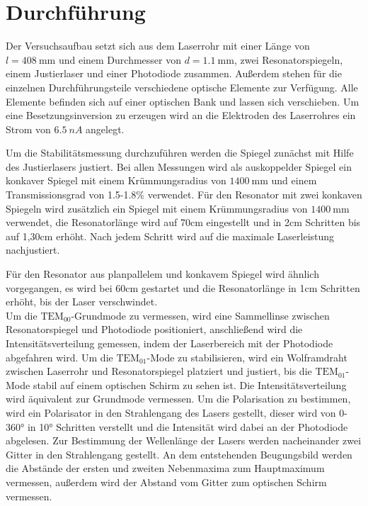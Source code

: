 \section{Durchführung}
\label{sec:Durchführung}
Der Versuchsaufbau setzt sich aus dem Laserrohr mit einer Länge von $l=\SI{408}{\mm}$ und einem
Durchmesser von $d=\SI{1.1}{\mm}$, zwei Resonatorspiegeln, einem Justierlaser
und einer Photodiode zusammen. Außerdem stehen für die einzelnen Durchführungsteile verschiedene
optische Elemente zur Verfügung. Alle Elemente befinden sich auf einer optischen Bank und lassen
sich verschieben. Um eine Besetzungsinversion zu erzeugen wird an die Elektroden des Laserrohres ein
Strom von $\SI{6.5}{nA}$ angelegt.

Um die Stabilitätsmessung durchzuführen werden die Spiegel zunächst mit Hilfe des Justierlasers
justiert. Bei allen Messungen wird als auskoppelder Spiegel ein konkaver Spiegel mit einem Krümmungsradius
von $\SI{1400}{\mm}$ und einem Transmissionsgrad von 1.5-1.8\% verwendet.
Für den Resonator mit zwei konkaven Spiegeln wird zusätzlich ein Spiegel mit einem Krümmungsradius von $\SI{1400}{\mm}$ verwendet,
die Resonatorlänge wird auf 70\;cm eingestellt
und in 2\;cm Schritten bis auf 1,30\;cm erhöht. Nach jedem Schritt wird auf die maximale Laserleistung nachjustiert.

Für den Resonator aus planpallelem und konkavem Spiegel wird ähnlich vorgegangen, es wird bei 60\;cm gestartet und die
Resonatorlänge in 1\;cm Schritten erhöht, bis der Laser verschwindet.\\
Um die $\text{TEM}_{00}$-Grundmode zu vermessen, wird eine Sammellinse zwischen Resonatorspiegel und Photodiode
positioniert, anschließend wird die Intensitätsverteilung gemessen, indem der Laserbereich mit der Photodiode
abgefahren wird. Um die $\text{TEM}_{01}$-Mode zu stabilisieren, wird ein Wolframdraht zwischen Laserrohr und
Resonatorspiegel platziert und justiert, bis die $\text{TEM}_{01}$-Mode stabil auf einem optischen Schirm zu sehen ist.
Die Intensitätsverteilung wird äquivalent zur Grundmode vermessen.
Um die Polarisation zu bestimmen, wird ein Polarisator in den Strahlengang des Lasers gestellt, dieser wird von
0-360° in 10° Schritten verstellt und die Intensität wird dabei an der Photodiode abgelesen.
Zur Bestimmung der Wellenlänge der Lasers werden nacheinander zwei Gitter in den Strahlengang gestellt.
An dem entstehenden Beugungsbild werden die Abstände der ersten und zweiten Nebenmaxima zum Hauptmaximum vermessen,
außerdem wird der Abstand vom Gitter zum optischen Schirm vermessen.
